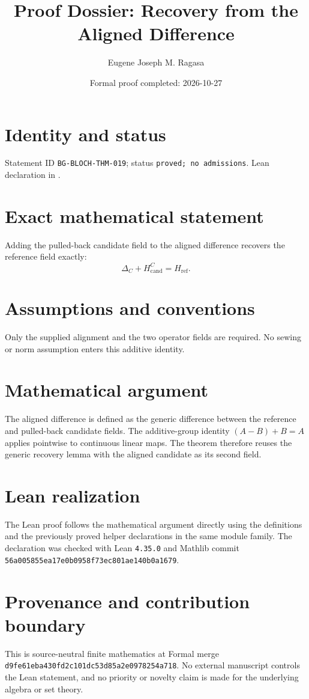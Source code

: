 \documentclass[11pt]{article}
\title{Proof Dossier: Recovery from the Aligned Difference}
\author{Eugene Joseph M. Ragasa}
\date{Formal proof completed: 2026-10-27}
\begin{document}
\raggedright
\maketitle

\section{Identity and status}
Statement ID \texttt{BG-BLOCH-THM-019}; status \texttt{proved; no admissions}.  Lean declaration
 in
.

\section{Exact mathematical statement}
Adding the pulled-back candidate field to the aligned difference recovers the reference field exactly:
\[
  \Delta_C+H_{\mathrm{cand}}^{C}=H_{\mathrm{ref}}.
\]

\section{Assumptions and conventions}
Only the supplied alignment and the two operator fields are required.  No sewing or norm assumption enters this additive identity.

\section{Mathematical argument}
The aligned difference is defined as the generic difference between the reference and pulled-back candidate fields.  The additive-group identity $(A-B)+B=A$ applies pointwise to continuous linear maps.  The theorem therefore reuses the generic recovery lemma with the aligned candidate as its second field.

\section{Lean realization}
The Lean proof follows the mathematical argument directly using the definitions and the
previously proved helper declarations in the same module family.  The declaration was checked
with Lean \texttt{4.35.0} and Mathlib commit \texttt{56a005855ea17e0b0958f73ec801ae140b0a1679}.

\section{Provenance and contribution boundary}
This is source-neutral finite mathematics at Formal merge
\texttt{d9fe61eba430fd2c101dc53d85a2e0978254a718}.  No external manuscript controls the Lean statement, and no priority or
novelty claim is made for the underlying algebra or set theory.
\end{document}
